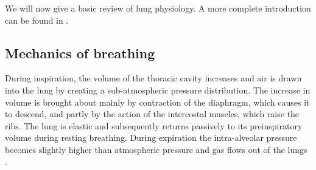 We will now give a basic review of lung physiology. A more complete introduction can be found in \citet{west2008respiratory,cotes2009lung}.
 
\subsection{Mechanics of breathing} 
During inspiration, the volume of the thoracic cavity increases and air is drawn into the lung by creating a sub-atmospheric pressure distribution. The increase in volume is brought about mainly by contraction of the diaphragm, which causes it to descend, and partly by the action of the intercostal muscles, which raise the ribs. 
The lung is elastic and subsequently returns passively to its preinspiratory volume during resting breathing. During expiration the intra-alveolar pressure becomes slightly higher than atmospheric pressure and gas flows out of the
lungs \citep{west2008respiratory}. 


